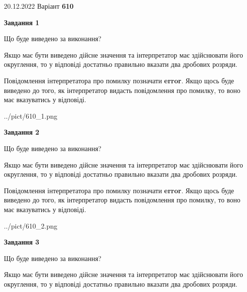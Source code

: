 \documentclass[12pt, ukrainian]{article}
\begin{document}
{20.12.2022 Варіант \No \textbf { 610 }\par}
{
\begin {Large}

{\begin {center}\textbf{Завдання 1}\end {center}}\par
Що буде виведено за виконання? \par

Якщо має бути виведено дійсне значення та інтерпретатор має здійснювати його округлення, 
то у відповіді достатньо правильно вказати два дробових розряди.

Повідомлення інтерпретатора про помилку позначати \textbf{error}.
Якщо щось буде виведено до того, як інтерпретатор видасть повідомлення про помилку, 
то воно має вказуватись у відповіді. \par

\begin{center}
	{../pict/610_1.png}
\end{center}
\newpage

{\begin {center}\textbf{Завдання 2}\end {center}}\par
Що буде виведено за виконання? \par

Якщо має бути виведено дійсне значення та інтерпретатор має здійснювати його округлення, 
то у відповіді достатньо правильно вказати два дробових розряди.

Повідомлення інтерпретатора про помилку позначати \textbf{error}.
Якщо щось буде виведено до того, як інтерпретатор видасть повідомлення про помилку, 
то воно має вказуватись у відповіді. \par

\begin{center}
	{../pict/610_2.png}
\end{center}
\newpage

{\begin {center}\textbf{Завдання 3}\end {center}}\par
Що буде виведено за виконання? \par

Якщо має бути виведено дійсне значення та інтерпретатор має здійснювати його округлення, 
то у відповіді достатньо правильно вказати два дробових розряди.


\end{Large}}
\end{document}
